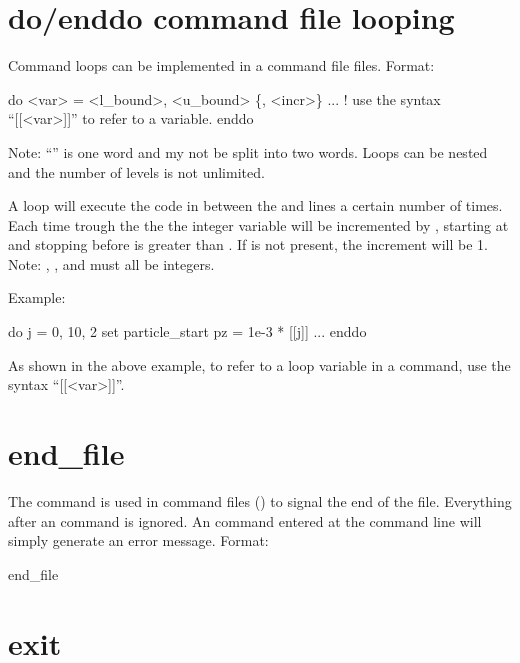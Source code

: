 \section{do/enddo command file looping}
\label{s:do}

Command loops can be implemented in a command file files. Format:
\begin{example}
  do <var> = <l_bound>, <u_bound> \{, <incr>\}
    ...   ! use the syntax ``[[<var>]]'' to refer to a variable.
  enddo
\end{example}
Note: ``'' is one word and my not be split into two words. Loops can be nested and the
number of levels is not unlimited.

A loop will execute the code in between the  and  lines a certain number of
times. Each time trough the the the integer variable  will be incremented by ,
starting at  and stopping before  is greater than . If
 is not present, the increment will be 1. Note: , , and
 must all be integers.

Example:
\begin{example}
  do j = 0, 10, 2
    set particle_start pz = 1e-3 * [[j]]
    ...
  enddo
\end{example}
As shown in the above example, to refer to a loop variable in a command, use the syntax ``[[<var>]]''.

\section{end_file} \label{s:end.file}

The  command is used in command files () to signal the end of the
file. Everything after an  command is ignored. An  command entered at the
command line will simply generate an error message.  Format:
\begin{example}
  end_file
\end{example}

\section{exit}
\label{s:exit}

